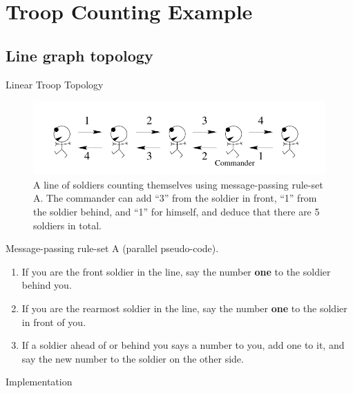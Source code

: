\documentclass[pdflatex,colorlinks,landscape]{beamer}
\begin{document}
\section{Troop Counting Example}

\subsection{Line graph topology}
\begin{frame}{Linear Troop Topology}
  \begin{figure}[H]
    \begin{center}
      \includegraphics[width=\textwidth]{LinearTroop.png}
    \end{center}
    \caption{A line of soldiers counting themselves using
      message-passing rule-set A. The commander can add ``3'' from the
      soldier in front, ``1'' from the soldier behind, and ``1'' for
      himself, and deduce that there are 5 soldiers in total.}
  \end{figure}
\end{frame}


\begin{frame}{Message-passing rule-set A (parallel pseudo-code).}
  \begin{enumerate}
  \item If you are the front soldier in the line, say the number \textbf{one} to the
    soldier behind you.
  \item If you are the rearmost soldier in the line, say the number \textbf{one} to
    the soldier in front of you.
  \item If a soldier ahead of or behind you says a number to you, add one
    to it, and say the new number to the soldier on the other side.
  \end{enumerate}
\end{frame}

\begin{frame}[allowframebreaks]{Implementation}
  \begin{small}
    
  \end{small}
\end{frame}
\end{document}
